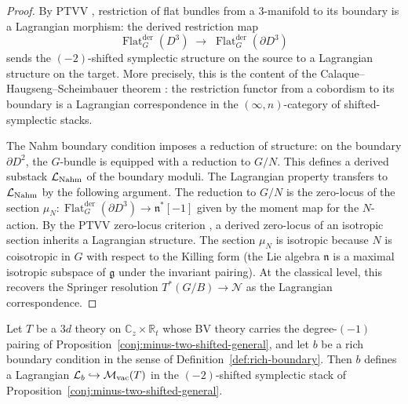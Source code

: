 \begin{proof}
By PTVV \cite{PTVV13}, restriction of flat bundles from a
$3$-manifold to its boundary is a Lagrangian morphism:
the derived restriction map
\[
 \operatorname{Flat}_G^{\mathrm{der}}(D^3)
 \;\longrightarrow\;
 \operatorname{Flat}_G^{\mathrm{der}}(\partial D^3)
\]
sends the $(-2)$-shifted symplectic structure on the source to a
Lagrangian structure on the target. More precisely, this is the
content of the Calaque--Haugseng--Scheimbauer theorem
\cite{CHS21}: the restriction functor from a cobordism to its
boundary is a Lagrangian correspondence in the $(\infty,n)$-category
of shifted-symplectic stacks.

The Nahm boundary condition imposes a reduction of structure:
on the boundary $\partial D^2$, the $G$-bundle is
equipped with a reduction to $G/N$. This defines a derived
substack $\mathcal L_{\mathrm{Nahm}}$ of the boundary moduli.
The Lagrangian property transfers to $\mathcal L_{\mathrm{Nahm}}$ by
the following argument. The reduction to $G/N$ is the
zero-locus of the section $\mu_N \colon
\operatorname{Flat}_G^{\mathrm{der}}(\partial D^3) \to
\mathfrak{n}^*[-1]$ given by the moment map for the $N$-action.
By the PTVV zero-locus criterion \cite{PTVV13}, a derived
zero-locus of an isotropic section inherits a Lagrangian
structure. The section $\mu_N$ is isotropic because $N$ is
coisotropic in $G$ with respect to the Killing form (the Lie
algebra $\mathfrak{n}$ is a maximal isotropic subspace of
$\mathfrak{g}$ under the invariant pairing). At the classical
level, this recovers the Springer resolution
$T^*(G/B) \to \mathcal{N}$ as the Lagrangian correspondence.
\end{proof}

\begin{proposition}
\label{prop:lagrangian-general}
\ClaimStatusConditional
Let $T$ be a $3d$ theory on $\mathbb{C}_z \times \mathbb{R}_t$
whose BV theory carries the degree-$(-1)$ pairing of
Proposition~\textup{\ref{conj:minus-two-shifted-general}}, and let $b$ be a rich
boundary condition in the sense of
Definition~\textup{\ref{def:rich-boundary}}. Then $b$ defines a
Lagrangian
$\mathcal L_b \hookrightarrow \mathcal M_{\mathrm{vac}}(T)$ in the
$(-2)$-shifted symplectic stack of
Proposition~\textup{\ref{conj:minus-two-shifted-general}}.
\end{proposition}

